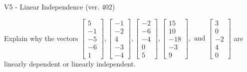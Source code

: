\begin{exercise}
  \begin{exerciseTitle}V5 - Linear Independence (ver. 402)\end{exerciseTitle}
  \begin{exerciseStatement}
    Explain why the vectors \(\left[\begin{array}{r}
5 \\
-1 \\
-5 \\
-6 \\
1
\end{array}\right] , \left[\begin{array}{r}
-1 \\
-2 \\
4 \\
-3 \\
-4
\end{array}\right] , \left[\begin{array}{r}
-2 \\
-6 \\
-4 \\
0 \\
5
\end{array}\right] , \left[\begin{array}{r}
15 \\
10 \\
-18 \\
-3 \\
9
\end{array}\right] , \text{ and } \left[\begin{array}{r}
3 \\
0 \\
-2 \\
4 \\
0
\end{array}\right]\) are linearly dependent or linearly independent.	



\end{exerciseStatement}
\end{exercise}
